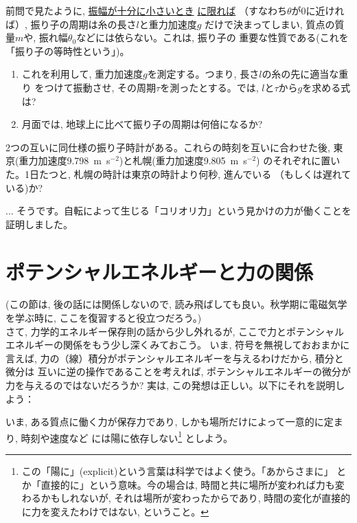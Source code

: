 \mv



\begin{q}\label{q:furiko_period}
前問で見たように, \underline{振幅が十分に小さいとき} \underline{に限れば}
（すなわち$\theta$が0に近ければ）, 振り子の周期は糸の長さ$l$と重力加速度$g$
だけで決まってしまい, 質点の質量$m$や, 振れ幅$\theta_0$などには依らない。これは, 振り子の
重要な性質である(これを「振り子の等時性という」)。
\begin{enumerate}
\item これを利用して, 重力加速度$g$を測定する。つまり, 長さ$l$の糸の先に適当な重り
をつけて振動させ, その周期$\tau$を測ったとする。では, $l$と$\tau$から$g$を求める式は? 
\item 月面では, 地球上に比べて振り子の周期は何倍になるか? 
\end{enumerate}
\end{q}

\begin{q} 2つの互いに同仕様の振り子時計がある。これらの時刻を互いに合わせた後, 
東京(重力加速度9.798~m~s$^{-2}$)と札幌(重力加速度9.805~m~s$^{-2}$)
のそれぞれに置いた。1日たつと, 札幌の時計は東京の時計より何秒, 進んでいる
（もしくは遅れている)か?\end{q}
\mv

\begin{faq}{\small{} ... 
そうです。自転によって生じる「コリオリ力」という見かけの力が働くことを証明しました。}\end{faq}\mv
\hv

\section{ポテンシャルエネルギーと力の関係}
(この節は, 後の話には関係しないので, 読み飛ばしても良い。秋学期に電磁気学
を学ぶ時に, ここを復習すると役立つだろう。)\\

さて, 力学的エネルギー保存則の話から少し外れるが, ここで力とポテンシャルエネルギーの関係をもう少し深くみておこう。
いま, 符号を無視しておおまかに言えば, 力の（線）積分がポテンシャルエネルギーを与えるわけだから, 積分と微分は
互いに逆の操作であることを考えれば, ポテンシャルエネルギーの微分が力を与えるのではないだろうか? 
実は, この発想は正しい。以下にそれを説明しよう：

いま, ある質点に働く力が保存力であり, しかも場所だけによって一意的に定まり, 時刻や速度など
には陽に依存しない\footnote{この「陽に」(explicit)という言葉は科学ではよく使う。「あからさまに」
とか「直接的に」という意味。今の場合は, 時間と共に場所が変われば力も変わるかもしれないが, 
それは場所が変わったからであり, 時間の変化が直接的に力を変えたわけではない, ということ。}
としよう。

